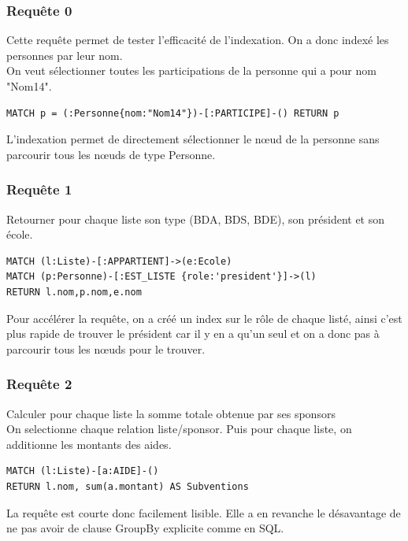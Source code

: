 \documentclass[a4paper,oneside,1pt]{article}
\begin{document}
\subsubsection{Requête 0}
Cette requête permet de tester l'efficacité de l'indexation. On a donc indexé les personnes par leur nom.
\\
On veut sélectionner toutes les participations de la personne qui a pour nom "Nom14". 
\\
\begin{verbatim}
MATCH p = (:Personne{nom:"Nom14"})-[:PARTICIPE]-() RETURN p
\end{verbatim}
L'indexation permet de directement sélectionner le nœud de la personne sans parcourir tous les nœuds de type Personne.

\subsubsection{Requête 1}
Retourner pour chaque liste son type (BDA, BDS, BDE), son président et son école.
\\
\begin{verbatim}
MATCH (l:Liste)-[:APPARTIENT]->(e:Ecole)
MATCH (p:Personne)-[:EST_LISTE {role:'president'}]->(l)
RETURN l.nom,p.nom,e.nom
\end{verbatim}

Pour accélérer la requête, on a créé un index sur le rôle de chaque listé, ainsi c'est plus rapide de trouver le président car il y en a qu'un seul et on a donc pas à parcourir tous les nœuds pour le trouver.


\subsubsection{Requête 2}
Calculer pour chaque liste la somme totale obtenue par ses sponsors
\\
On selectionne chaque relation liste/sponsor. Puis pour chaque liste, on additionne les montants des aides.
\\
\begin{verbatim}
MATCH (l:Liste)-[a:AIDE]-() 
RETURN l.nom, sum(a.montant) AS Subventions
\end{verbatim}

La requête est courte donc facilement lisible. Elle a en revanche le désavantage de ne pas avoir de clause GroupBy explicite comme en SQL.
\end{document}
